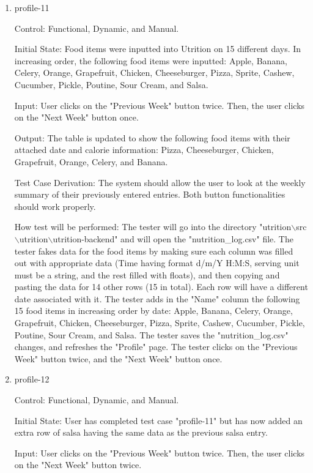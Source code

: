 \documentclass[12pt, titlepage]{article}
\begin{document}
\begin{enumerate}
		\item{profile-11\\}
		
		Control: Functional, Dynamic, and Manual.
		
		Initial State: Food items were inputted into Utrition on 15 different days. In increasing order, the following food items were inputted: Apple, Banana, Celery, Orange, Grapefruit, Chicken, Cheeseburger, Pizza, Sprite, Cashew, Cucumber, Pickle, Poutine, Sour Cream, and Salsa.
		
		Input: User clicks on the "Previous Week" button twice. Then, the user clicks on the "Next Week" button once.
		
		Output: The table is updated to show the following food items with their attached date and calorie information: Pizza, Cheeseburger, Chicken, Grapefruit, Orange, Celery, and Banana.
		
		Test Case Derivation: The system should allow the user to look at the weekly summary of their previously entered entries. Both button functionalities should work properly.
		
		How test will be performed: The tester will go into the directory "utrition$\backslash$src$\backslash$utrition$\backslash$utrition-backend" and will open the "nutrition\_log.csv" file. The tester fakes data for the food items by making sure each column was filled out with appropriate data (Time having format d/m/Y H:M:S, serving unit must be a string, and the rest filled with floats), and then copying and pasting the data for 14 other rows (15 in total). Each row will have a different date associated with it. The tester adds in the "Name" column the following 15 food items in increasing order by date: Apple, Banana, Celery, Orange, Grapefruit, Chicken, Cheeseburger, Pizza, Sprite, Cashew, Cucumber, Pickle, Poutine, Sour Cream, and Salsa. The tester saves the "nutrition\_log.csv" changes, and refreshes the "Profile" page. The tester clicks on the "Previous Week" button twice, and the "Next Week" button once.
		
		\item{profile-12\\}
		
		Control: Functional, Dynamic, and Manual.
		
		Initial State:  User has completed test case "profile-11" but has now added an extra row of salsa having the same data as the previous salsa entry.
		
		Input: User clicks on the "Previous Week" button twice. Then, the user clicks on the "Next Week" button twice.
		

\end{enumerate}
\end{document}
